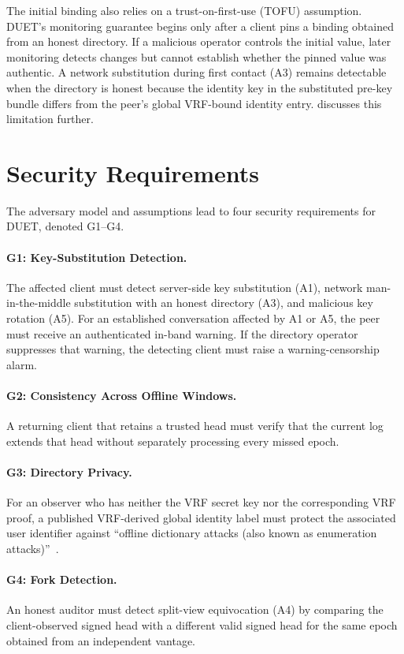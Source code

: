 The initial binding also relies on a trust-on-first-use (TOFU)
assumption.\label{sec:threat-fair} DUET's monitoring guarantee begins only after a client pins a
binding obtained from an honest directory. If a malicious operator controls the initial value,
later monitoring detects changes but cannot establish whether the pinned value was authentic. A
network substitution during first contact (A3) remains detectable when the directory is honest
because the identity key in the substituted pre-key bundle differs from the peer's global
VRF-bound identity entry.  discusses this limitation further.

\FloatBarrier
\section{Security Requirements}\label{sec:threat-goals}

The adversary model and assumptions lead to four security requirements for DUET, denoted G1--G4.

\paragraph{G1: Key-Substitution Detection.} The affected client must detect server-side key
substitution (A1), network man-in-the-middle substitution with an honest directory (A3), and
malicious key rotation (A5). For an established conversation affected by A1 or A5, the peer must
receive an authenticated in-band warning. If the directory operator suppresses that warning,
the detecting client must raise a warning-censorship alarm.

\paragraph{G2: Consistency Across Offline Windows.} A returning client that retains a trusted head
must verify that the current log extends that head without separately processing every missed epoch.

\paragraph{G3: Directory Privacy.} For an observer who has neither the VRF secret key nor the
corresponding VRF proof, a published VRF-derived global identity label must protect the associated user
identifier against ``offline dictionary attacks (also known as enumeration
attacks)''~\cite{rfc9381}.

\paragraph{G4: Fork Detection.} An honest auditor must detect split-view equivocation (A4) by
comparing the client-observed signed head with a different valid signed head for the same epoch
obtained from an independent vantage.
